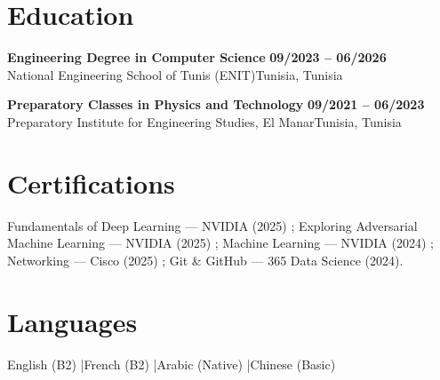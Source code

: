 \documentclass[a4paper,10pt]{article}
\newcommand{\cventry}[4]{\textbf{#1} \hfill \textbf{#4}\\[1pt]#2{\ifx\relax#3\relax\else, #3\fi}\par\vspace{2pt}}
\begin{document}
\section{Education}
\cventry{Engineering Degree in Computer Science}{National Engineering School of Tunis (ENIT)}{Tunisia}{09/2023 -- 06/2026}
\cventry{Preparatory Classes in Physics and Technology}{Preparatory Institute for Engineering Studies, El Manar}{Tunisia}{09/2021 -- 06/2023}
\section{Certifications}
Fundamentals of Deep Learning — NVIDIA (2025) ; Exploring Adversarial Machine Learning — NVIDIA (2025) ; Machine Learning — NVIDIA (2024) ; Networking — Cisco (2025) ; Git \& GitHub — 365 Data Science (2024).
\section{Languages}
English (B2) \quad|\quad French (B2) \quad|\quad Arabic (Native) \quad|\quad Chinese (Basic)
\end{document}
